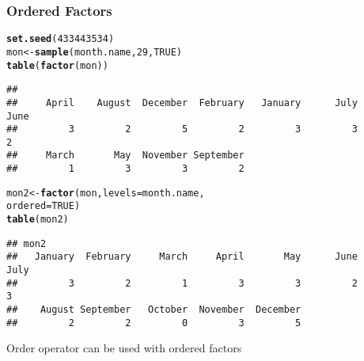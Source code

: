 \documentclass[paper=screen,mathserif]{beamer}\usepackage[]{graphicx}\usepackage[]{color}
\makeatletter
\newcommand{\hlnum}[1]{\textcolor[rgb]{0.686,0.059,0.569}{#1}}%
\newcommand{\hlstd}[1]{\textcolor[rgb]{0.345,0.345,0.345}{#1}}%
\newcommand{\hlkwb}[1]{\textcolor[rgb]{0.69,0.353,0.396}{#1}}%
\newcommand{\hlkwc}[1]{\textcolor[rgb]{0.333,0.667,0.333}{#1}}%
\newcommand{\hlkwd}[1]{\textcolor[rgb]{0.737,0.353,0.396}{\textbf{#1}}}%
\newenvironment{kframe}{%
 \def\at@end@of@kframe{}%
 \ifinner\ifhmode%
  \def\at@end@of@kframe{\end{minipage}}%
  \begin{minipage}{\columnwidth}%
 \fi\fi%
 \def\FrameCommand##1{\hskip\@totalleftmargin \hskip-\fboxsep
 \colorbox{shadecolor}{##1}\hskip-\fboxsep
     \hskip-\linewidth \hskip-\@totalleftmargin \hskip\columnwidth}%
 \MakeFramed {\advance\hsize-\width
   \@totalleftmargin\z@ \linewidth\hsize
   \@setminipage}}%
 {\par\unskip\endMakeFramed%
 \at@end@of@kframe}
\newenvironment{knitrout}{}{} %
\newcommand{\ft}[1]{\frametitle{#1}}
\makeatother
\begin{document}
\begin{frame}[fragile]
  \ft{Ordered Factors}
\begin{knitrout}\scriptsize
{}\color{fgcolor}\begin{kframe}
\begin{alltt}
\hlkwd{set.seed}\hlstd{(}\hlnum{433443534}\hlstd{)}
\hlstd{mon} \hlkwb{<-} \hlkwd{sample}\hlstd{(month.name,} \hlnum{29}\hlstd{,} \hlnum{TRUE}\hlstd{)}
\hlkwd{table}\hlstd{(}\hlkwd{factor}\hlstd{(mon))}
\end{alltt}
\begin{verbatim}
## 
##     April    August  December  February   January      July      June 
##         3         2         5         2         3         3         2 
##     March       May  November September 
##         1         3         3         2
\end{verbatim}
\end{kframe}
\end{knitrout}
\begin{knitrout}\scriptsize
{}\color{fgcolor}\begin{kframe}
\begin{alltt}
\hlstd{mon2} \hlkwb{<-} \hlkwd{factor}\hlstd{(mon,} \hlkwc{levels} \hlstd{= month.name,}
               \hlkwc{ordered} \hlstd{=} \hlnum{TRUE}\hlstd{)}
\hlkwd{table}\hlstd{(mon2)}
\end{alltt}
\begin{verbatim}
## mon2
##   January  February     March     April       May      June      July 
##         3         2         1         3         3         2         3 
##    August September   October  November  December 
##         2         2         0         3         5
\end{verbatim}
\end{kframe}
\end{knitrout}
{\small Order operator can be used with ordered factors}
\end{frame}
\end{document}
